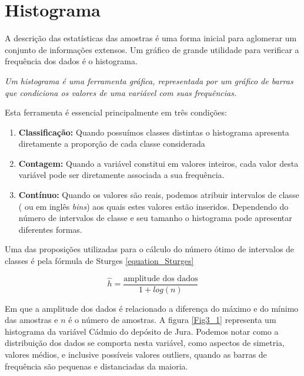 \section{Histograma}

A descrição das estatísticas das amostras é uma forma inicial para aglomerar um conjunto de informações extensos. Um gráfico de grande utilidade para verificar a frequência dos dados é o histograma. 

\begin{definition}[histograma]
	\textit{Um histograma é uma ferramenta gráfica, representada por um gráfico de barras que condiciona os valores de uma variável com suas frequências.}
\end{definition}

Esta ferramenta é essencial principalmente em três condições:

\begin{enumerate}
	\item \textbf{Classificação:} Quando possuímos classes distintas o histograma apresenta diretamente a proporção de cada classe considerada
	\item \textbf{Contagem:} Quando a variável constitui em valores inteiros, cada valor desta variável pode ser diretamente associada a sua frequência.
	\item \textbf{Contínuo:} Quando os valores são reais, podemos atribuir intervalos de classe ( ou em inglês \textit{bins}) aos quais estes valores estão inseridos. Dependendo do número de intervalos de classe e seu tamanho o histograma pode apresentar diferentes formas.
\end{enumerate}

Uma das proposições utilizadas para o cálculo do número ótimo de intervalos de classes é pela fórmula de Sturges \ref{equation_Sturges} 

\begin{equation}\label{equation_Sturges}
	\hat{h} = \frac{\text{amplitude dos dados}}{1+ log(n)}
\end{equation}
 
 Em que a amplitude dos dados é relacionado a diferença do máximo e do mínimo das amostras e $n$ é o número de amostras. A figura \ref{Fig3_1} representa um histograma da variável Cádmio do depósito de Jura. Podemos notar como a distribuição dos dados se comporta nesta variável, como aspectos de simetria, valores médios, e inclusive possíveis valores outliers, quando as barras de frequência são pequenas e distanciadas da maioria.

